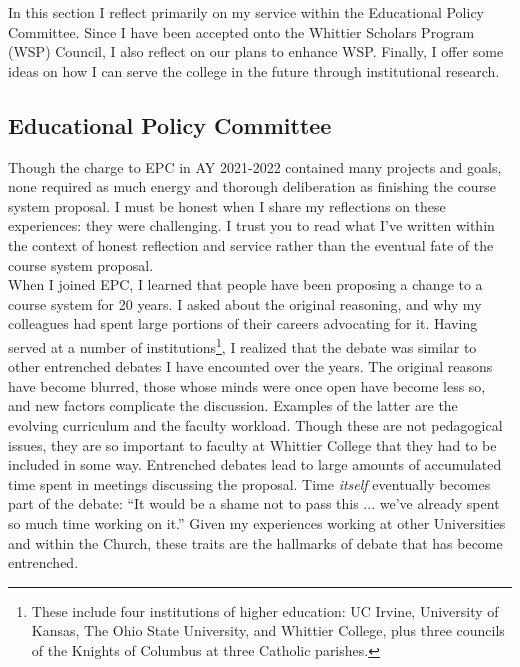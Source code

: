 \documentclass[../../../main.tex]{subfiles}
\begin{document}
\label{sec:committee_service}

In this section I reflect primarily on my service within the Educational Policy Committee.  Since I have been accepted onto the Whittier Scholars Program (WSP) Council, I also reflect on our plans to enhance WSP.  Finally, I offer some ideas on how I can serve the college in the future through institutional research.

\subsection{Educational Policy Committee}

Though the charge to EPC in AY 2021-2022 contained many projects and goals, none required as much energy and thorough deliberation as finishing the course system proposal.  I must be honest when I share my reflections on these experiences: they were challenging.  I trust you to read what I've written within the context of honest reflection and service rather than the eventual fate of the course system proposal.
\\
\vspace{0.25cm}
When I joined EPC, I learned that people have been proposing a change to a course system for 20 years.  I asked about the original reasoning, and why my colleagues had spent large portions of their careers advocating for it.  Having served at a number of institutions\footnote{These include four institutions of higher education: UC Irvine, University of Kansas, The Ohio State University, and Whittier College, plus three councils of the Knights of Columbus at three Catholic parishes.}, I realized that the debate was similar to other entrenched debates I have encounted over the years.  The original reasons have become blurred, those whose minds were once open have become less so, and new factors complicate the discussion.  Examples of the latter are the evolving curriculum and the faculty workload.  Though these are not pedagogical issues, they are so important to faculty at Whittier College that they had to be included in some way.  Entrenched debates lead to large amounts of accumulated time spent in meetings discussing the proposal.  Time \textit{itself} eventually becomes part of the debate: ``It would be a shame not to pass this ... we've already spent so much time working on it.''  Given my experiences working at other Universities and within the Church, these traits are the hallmarks of debate that has become entrenched.
\\
\vspace{0.25cm}
\end{document}
